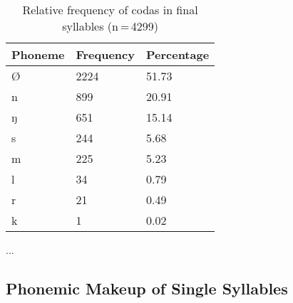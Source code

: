 \begin{table}[hp]\centering
\caption[Relative frequency of codas in final syllables]{Relative frequency of codas in final syllables (n\,=\,4299)}
\begin{tabu} to 0.5\textwidth{X X[c] X[c]}
\tableheaderfont\toprule
Phoneme
	& Frequency
	& Percentage
	\\
	
\toprule

Ø
	& 2224
	& 51.73\pct
	\\

\midrule

n
	& 899
	& 20.91\pct
	\\
ŋ
	& 651
	& 15.14\pct
	\\
s
	& 244
	& 5.68\pct
	\\
m
	& 225
	& 5.23\pct
	\\
l
	& 34
	& 0.79\pct
	\\
r
	& 21
	& 0.49\pct
	\\
k
	& 1
	& 0.02\pct
	\\

\bottomrule
\end{tabu}
\label{tab:fincod}
\end{table}

...

\subsection{Phonemic Makeup of Single Syllables}

